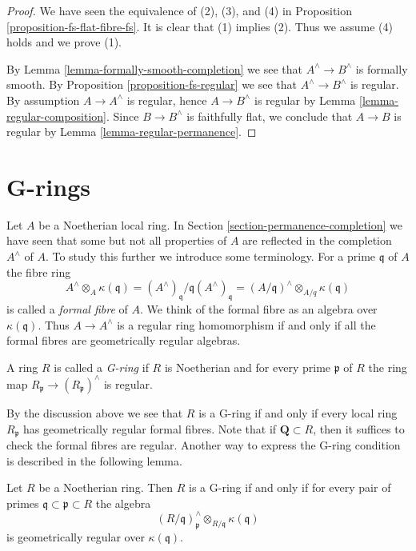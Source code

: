 \begin{proof}
We have seen the equivalence of (2), (3), and (4) in
Proposition \ref{proposition-fs-flat-fibre-fs}.
It is clear that (1) implies (2). Thus we assume (4) holds
and we prove (1).

\medskip\noindent
By Lemma \ref{lemma-formally-smooth-completion} we see that
$A^\wedge \to B^\wedge$ is formally smooth. By
Proposition \ref{proposition-fs-regular} we see that $A^\wedge \to B^\wedge$
is regular. By assumption $A \to A^\wedge$ is regular, hence $A \to B^\wedge$
is regular by Lemma \ref{lemma-regular-composition}.
Since $B \to B^\wedge$ is faithfully flat, we conclude that
$A \to B$ is regular by Lemma \ref{lemma-regular-permanence}.
\end{proof}




\section{G-rings}
\label{section-G-ring}

\noindent
Let $A$ be a Noetherian local ring. In
Section \ref{section-permanence-completion}
we have seen that some but not all properties of $A$ are reflected in
the completion $A^\wedge$ of $A$. To study this further we introduce
some terminology. For a prime $\mathfrak q$ of $A$ the fibre ring
$$
A^\wedge \otimes_A \kappa(\mathfrak q) =
(A^\wedge)_\mathfrak q/\mathfrak q(A^\wedge)_\mathfrak q =
(A/\mathfrak q)^\wedge \otimes_{A/q} \kappa(\mathfrak q)
$$
is called a {\it formal fibre} of $A$. We think of the formal
fibre as an algebra over $\kappa(\mathfrak q)$. Thus $A \to A^\wedge$
is a regular ring homomorphism if and only if all the formal fibres are
geometrically regular algebras.

\begin{definition}
\label{definition-G-ring}
A ring $R$ is called a {\it G-ring} if $R$ is Noetherian and for every
prime $\mathfrak p$ of $R$ the ring map
$R_\mathfrak p \to (R_\mathfrak p)^\wedge$ is regular.
\end{definition}

\noindent
By the discussion above we see that $R$ is a G-ring if and only if
every local ring $R_\mathfrak p$ has geometrically regular formal fibres.
Note that if $\mathbf{Q} \subset R$, then it suffices to check the
formal fibres are regular.
Another way to express the G-ring condition is described in the
following lemma.

\begin{lemma}
\label{lemma-check-G-ring-easy}
Let $R$ be a Noetherian ring. Then $R$ is a G-ring if and only if
for every pair of primes $\mathfrak q \subset \mathfrak p \subset R$
the algebra
$$
(R/\mathfrak q)_\mathfrak p^\wedge \otimes_{R/\mathfrak q} \kappa(\mathfrak q)
$$
is geometrically regular over $\kappa(\mathfrak q)$.
\end{lemma}

